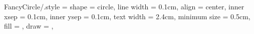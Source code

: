 \graphicspath{{../Images/}}


\tikzset
{
	FancyCircle/.style =
	{
		shape					= circle,
		line width				= 0.1cm,
		align					= center,
		inner xsep				= 0.1cm,
		inner ysep				= 0.1cm,
		text width				= 2.4cm,
		minimum size			= 0.5cm,
		fill					= \SoftSecondary,
		draw					= \StrongPrimary,
	}
}
